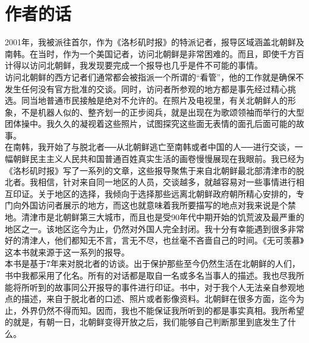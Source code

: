 \fancyhead[RO]{\thepage}
\fancyhead[LE]{\thepage}
\fancyfoot[LE,RO]{}
\fancyfoot[LO,CE]{}
\fancyfoot[CO,RE]{}
\chapter*{作者的话}
2001年，我被派往首尔，作为《洛杉矶时报》的特派记者，报导区域涵盖北朝鲜及南韩。在当时，作为一个美国记者，访问北朝鲜是非常困难的。而且，即使千方百计得以访问北朝鲜，我发现要完成一个报导也几乎是件不可能的事情。\\

访问北朝鲜的西方记者们通常都会被指派一个所谓的“看管”，他的工作就是确保不发生任何没有官方批准的交谈。同时，访问者所参观的地方都是事先经过精心挑选。同当地普通市民接触是绝对不允许的。在照片及电视里，有关北朝鲜人的形象，不是机器人似的、整齐划一的正步阅兵，就是出现在为歌颂领袖而举行的大型团体操中。我久久的凝视着这些照片，试图探究这些面无表情的面孔后面可能的故事。\\

在南韩，我开始了与脱北者──从北朝鲜逃亡至南韩或者中国的人──进行交谈，一幅朝鲜民主主义人民共和国普通百姓真实生活的画卷慢慢展现在我眼前。我已经为《洛杉矶时报》写了一系列的文章，这些报导聚焦于来自北朝鲜最北部清津市的脱北者。我相信，针对来自同一地区的人员，交谈越多，就越容易对一些事情进行相互印证。关于地区的选择，我倾向于选择那些远离北朝鲜政府朝所精心安排的，专门向外国访问者展示的地方，而这也就意味着我所要描写的地点对我来说是个禁地。清津市是北朝鲜第三大城市，而且也是受90年代中期开始的饥荒波及最严重的地区之一。该地区迄今为止，仍然对外国人完全封闭。我十分有幸能遇到很多非常好的清津人，他们都知无不言，言无不尽，也丝毫不吝啬自己的时间。《无可羡慕》这本书就来源于这一系列的报导。\\

本书是基于7年来对脱北者的访谈。出于保护那些至今仍然生活在北朝鲜的人们，书中我都采用了化名。所有的对话都是取自一名或多名当事人的描述。我也尽我所能将所听到的故事同公开报导的事件进行印证。书中，对于我个人无法亲自参观地点的描述，来自于脱北者的口述、照片或者影像资料。北朝鲜在很多方面，迄今为止，外界仍然不得而知。因而，我也不能保证我所听到的都是事实真相。我所希望的就是，有朝一日，北朝鲜变得开放之后，我们能够自己判断那里到底发生了什么。\\